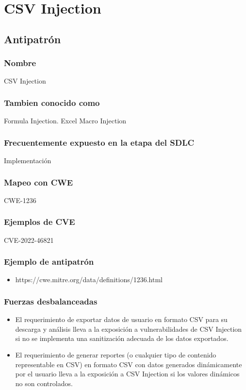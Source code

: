 \chapter{CSV Injection}
\section{Antipatrón}
\subsection*{Nombre}
 CSV Injection 
\subsection*{Tambien conocido como}
Formula Injection. Excel Macro Injection	
\subsection*{Frecuentemente expuesto en la etapa del SDLC}
Implementación
\subsection*{Mapeo con CWE}
CWE-1236
\subsection*{Ejemplos de CVE}
CVE-2022-46821

\subsection*{Ejemplo de antipatrón}
\begin{itemize}
    \item https://cwe.mitre.org/data/definitions/1236.html
\end{itemize}
\subsection*{Fuerzas desbalanceadas}
\begin{itemize}
    \item El requerimiento de exportar datos de usuario en formato CSV para su descarga y análisis lleva a la exposición a vulnerabilidades de CSV Injection si no se implementa una sanitización adecuada de los datos exportados.
    \item El requerimiento de generar reportes (o cualquier tipo de contenido representable en CSV) en formato CSV con datos generados dinámicamente por el usuario lleva a la exposición a CSV Injection si  los valores dinámicos no son controlados.
\end{itemize}
